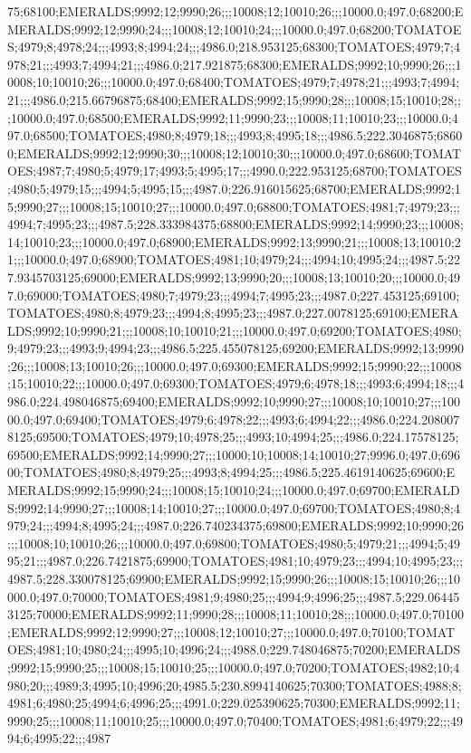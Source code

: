75;68100;EMERALDS;9992;12;9990;26;;;10008;12;10010;26;;;10000.0;497.0;68200;EMERALDS;9992;12;9990;24;;;10008;12;10010;24;;;10000.0;497.0;68200;TOMATOES;4979;8;4978;24;;;4993;8;4994;24;;;4986.0;218.953125;68300;TOMATOES;4979;7;4978;21;;;4993;7;4994;21;;;4986.0;217.921875;68300;EMERALDS;9992;10;9990;26;;;10008;10;10010;26;;;10000.0;497.0;68400;TOMATOES;4979;7;4978;21;;;4993;7;4994;21;;;4986.0;215.66796875;68400;EMERALDS;9992;15;9990;28;;;10008;15;10010;28;;;10000.0;497.0;68500;EMERALDS;9992;11;9990;23;;;10008;11;10010;23;;;10000.0;497.0;68500;TOMATOES;4980;8;4979;18;;;4993;8;4995;18;;;4986.5;222.3046875;68600;EMERALDS;9992;12;9990;30;;;10008;12;10010;30;;;10000.0;497.0;68600;TOMATOES;4987;7;4980;5;4979;17;4993;5;4995;17;;;4990.0;222.953125;68700;TOMATOES;4980;5;4979;15;;;4994;5;4995;15;;;4987.0;226.916015625;68700;EMERALDS;9992;15;9990;27;;;10008;15;10010;27;;;10000.0;497.0;68800;TOMATOES;4981;7;4979;23;;;4994;7;4995;23;;;4987.5;228.333984375;68800;EMERALDS;9992;14;9990;23;;;10008;14;10010;23;;;10000.0;497.0;68900;EMERALDS;9992;13;9990;21;;;10008;13;10010;21;;;10000.0;497.0;68900;TOMATOES;4981;10;4979;24;;;4994;10;4995;24;;;4987.5;227.9345703125;69000;EMERALDS;9992;13;9990;20;;;10008;13;10010;20;;;10000.0;497.0;69000;TOMATOES;4980;7;4979;23;;;4994;7;4995;23;;;4987.0;227.453125;69100;TOMATOES;4980;8;4979;23;;;4994;8;4995;23;;;4987.0;227.0078125;69100;EMERALDS;9992;10;9990;21;;;10008;10;10010;21;;;10000.0;497.0;69200;TOMATOES;4980;9;4979;23;;;4993;9;4994;23;;;4986.5;225.455078125;69200;EMERALDS;9992;13;9990;26;;;10008;13;10010;26;;;10000.0;497.0;69300;EMERALDS;9992;15;9990;22;;;10008;15;10010;22;;;10000.0;497.0;69300;TOMATOES;4979;6;4978;18;;;4993;6;4994;18;;;4986.0;224.498046875;69400;EMERALDS;9992;10;9990;27;;;10008;10;10010;27;;;10000.0;497.0;69400;TOMATOES;4979;6;4978;22;;;4993;6;4994;22;;;4986.0;224.2080078125;69500;TOMATOES;4979;10;4978;25;;;4993;10;4994;25;;;4986.0;224.17578125;69500;EMERALDS;9992;14;9990;27;;;10000;10;10008;14;10010;27;9996.0;497.0;69600;TOMATOES;4980;8;4979;25;;;4993;8;4994;25;;;4986.5;225.4619140625;69600;EMERALDS;9992;15;9990;24;;;10008;15;10010;24;;;10000.0;497.0;69700;EMERALDS;9992;14;9990;27;;;10008;14;10010;27;;;10000.0;497.0;69700;TOMATOES;4980;8;4979;24;;;4994;8;4995;24;;;4987.0;226.740234375;69800;EMERALDS;9992;10;9990;26;;;10008;10;10010;26;;;10000.0;497.0;69800;TOMATOES;4980;5;4979;21;;;4994;5;4995;21;;;4987.0;226.7421875;69900;TOMATOES;4981;10;4979;23;;;4994;10;4995;23;;;4987.5;228.330078125;69900;EMERALDS;9992;15;9990;26;;;10008;15;10010;26;;;10000.0;497.0;70000;TOMATOES;4981;9;4980;25;;;4994;9;4996;25;;;4987.5;229.064453125;70000;EMERALDS;9992;11;9990;28;;;10008;11;10010;28;;;10000.0;497.0;70100;EMERALDS;9992;12;9990;27;;;10008;12;10010;27;;;10000.0;497.0;70100;TOMATOES;4981;10;4980;24;;;4995;10;4996;24;;;4988.0;229.748046875;70200;EMERALDS;9992;15;9990;25;;;10008;15;10010;25;;;10000.0;497.0;70200;TOMATOES;4982;10;4980;20;;;4989;3;4995;10;4996;20;4985.5;230.8994140625;70300;TOMATOES;4988;8;4981;6;4980;25;4994;6;4996;25;;;4991.0;229.025390625;70300;EMERALDS;9992;11;9990;25;;;10008;11;10010;25;;;10000.0;497.0;70400;TOMATOES;4981;6;4979;22;;;4994;6;4995;22;;;4987